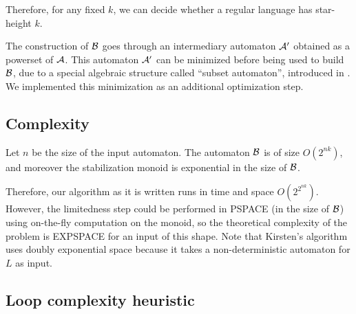 Therefore, for any fixed $k$, we can decide whether a regular language has star-height $k$.

The construction of $\mathcal B$ goes through an intermediary automaton $\mathcal{A}'$ obtained as a powerset of $\mathcal{A}$. This automaton $\mathcal{A}'$ can be minimized before being used to build $\mathcal B$, due to a special algebraic structure called ``subset automaton'', introduced in \cite{CL08sh}.
We implemented this minimization as an additional optimization step.
%




\subsection{Complexity}

Let $n$ be the size of the input automaton.
The automaton $\mathcal B$ is of size $O(2^{nk})$, and moreover the stabilization monoid is exponential in the size of $\mathcal B$.

Therefore, our algorithm as it is written runs in time and space $O(2^{2^{nk}})$. However, the limitedness step could be performed in PSPACE (in the size of $\mathcal B$) using on-the-fly computation on the monoid, 
so the theoretical complexity of the problem is EXPSPACE for an input of this shape. 
Note that Kirsten's algorithm uses doubly exponential space because it takes a non-deterministic automaton for $L$ as input.

\subsection{Loop complexity heuristic}

\newcommand{\lc}{\mathrm{LC}}

